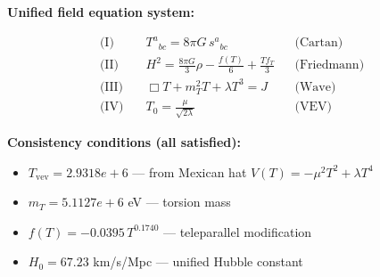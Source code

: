 
\textbf{Unified field equation system:}

\begin{align}
  \text{(I)} \quad & T^a{}_{bc} = 8\pi G \, s^a{}_{bc} && \text{(Cartan)} \\
  \text{(II)} \quad & H^2 = \frac{8\pi G}{3}\rho - \frac{f(T)}{6} + \frac{Tf_T}{3} && \text{(Friedmann)} \\
  \text{(III)} \quad & \Box T + m_T^2 T + \lambda T^3 = J && \text{(Wave)} \\
  \text{(IV)} \quad & T_0 = \frac{\mu}{\sqrt{2\lambda}} && \text{(VEV)}
\end{align}

\textbf{Consistency conditions (all satisfied):}
\begin{itemize}
  \item $T_{\text{vev}} = 2.9318e+6$ — from Mexican hat $V(T) = -\mu^2 T^2 + \lambda T^4$
  \item $m_T = 5.1127e+6$ eV — torsion mass
  \item $f(T) = -0.0395 \, T^{0.1740}$ — teleparallel modification
  \item $H_0 = 67.23$ km/s/Mpc — unified Hubble constant
\end{itemize}